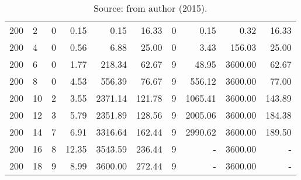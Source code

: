 \begin{appendices}
\begin{table*}[h]
\begin{center}
\begin{tabular} {l l | r r r r | r r r r}
 200 & 2                                 &   0             & 0.15          &  0.15       &  16.33       &  0           &  0.15     &  0.32       &  16.33           \\ 
 200 & 4                                 &   0             & 0.56          &  6.88       &  25.00       &  0           &  3.43     &  156.03     &  25.00           \\ 
 200 & 6                                 &   0             & 1.77          &  218.34     &  62.67       &  9           &  48.95    &  3600.00    &  62.67           \\ 
 200 & 8                                 &   0             & 4.53          &  556.39     &  76.67       &  9           &  556.12   &  3600.00    &  77.00           \\ 
 200 & 10                                &   2             & 3.55          &  2371.14    &  121.78      &  9           &  1065.41  &  3600.00    &  143.89          \\ 
 200 & 12                                &   3             & 5.79          &  2351.89    &  128.56      &  9           &  2005.06  &  3600.00    &  184.38          \\ 
 200 & 14                                &   7             & 6.91          &  3316.64    &  162.44      &  9           &  2990.62  &  3600.00    &  189.50          \\ 
 200 & 16                                &   8             & 12.35         &  3543.59    &  236.44      &  9           &  -        &  3600.00    &  -               \\ 
 200 & 18                                &   9             & 8.99          &  3600.00    &  272.44      &  9           &  -        &  3600.00    &  -               \\ 
\hline
\end{tabular}\caption*{Source: from author (2015).}

\end{center}
\end{table*}


\end{appendices}
